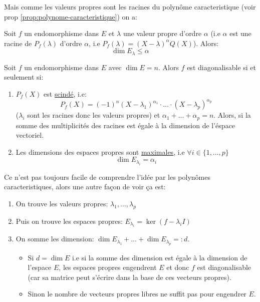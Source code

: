 Mais comme les valeurs propres sont les racines du polynôme caracteristique (voir prop \ref{prop:polynome-caracteristique}) on a:
\begin{prop}
    Soit $f$ un endomorphisme dans $E$ et  $\lambda$ une valeur propre d'ordre  $\alpha$ (i.e $\alpha$ est une racine de  $P_f(\lambda)$ d'ordre  $\alpha$, i.e  $P_f(\lambda) = (X - \lambda)^{\alpha}Q(X)$). Alors:
   \[
   \dim E_{\lambda} \le \alpha
   \] 
\end{prop}
\begin{theorem}
   Soit $f$ un endomorphisme dans  $E$ avec $\dim E = n$. Alors  $f$ est diagonalisable si et seulement si: 
   \begin{enumerate}
       \item $P_f(X)$ est \underline{scindé}, i.e:
            \[
                P_f(X) = (-1)^n (X - \lambda_1)^{\alpha_1} \cdot \ldots \cdot (X - \lambda_p)^{\alpha_p}
           \] 
           ($\lambda_i$ sont les racines donc les valeurs propres) et $\alpha_1 + \ldots + \alpha_p = n$. Alors, si la somme des multiplicités des racines est égale à la dimension de l'éspace vectoriel.
       \item Les dimensions des espaces propres sont \underline{maximales}, i.e $\forall i \in \{1, \ldots, p\}$
           \[
                \dim E_{\lambda_i} = \alpha_i 
           \] 
   \end{enumerate}
\end{theorem}
\begin{intuition}
   Ce n'est pas toujours facile de comprendre l'idée par les polynômes caracteristiques, alors une autre façon de voir ça est:
   \begin{enumerate}
       \item On trouve les valeurs propres: $\lambda_1, \ldots, \lambda_p$
       \item Puis on trouve les espaces propres: $E_{\lambda_i} = \ker(f - \lambda_i I)$
       \item On somme les dimension: $\dim E_{\lambda_1} + \ldots + \dim E_{\lambda_p} =: d$.  
           \begin{itemize}
               \item 
                   Si $d = \dim E$ i.e si la somme des dimension est égale à la dimension de l'espace  $E$, les espaces propres engendrent  $E$ et donc  $f$ est diagonalisable (car sa matrice peut s'écrire dans la base de ces vecteurs propres).
              \item Sinon le nombre de vecteurs propres libres ne suffit pas pour engendrer  $E$.
           \end{itemize}
   \end{enumerate}
\end{intuition}

